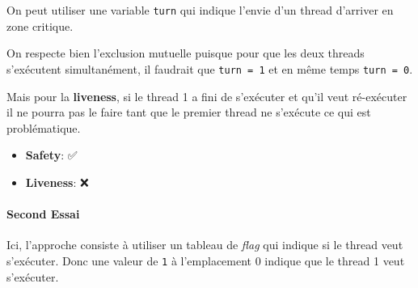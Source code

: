 On peut utiliser une variable \texttt{turn} qui indique l'envie d'un
thread d'arriver en zone critique.

\begin{Shaded}
\begin{Highlighting}[]
 \OperatorTok{(}\OperatorTok{!=}\OperatorTok{)} \OperatorTok{\{} 
\OperatorTok{\}} 
\OperatorTok{();}
\OperatorTok{=}\OperatorTok{;}

 \OperatorTok{(}\OperatorTok{!=}\OperatorTok{)} \OperatorTok{\{}
\OperatorTok{\}} 
\OperatorTok{();}
\OperatorTok{=}\OperatorTok{;}
\end{Highlighting}
\end{Shaded}

On respecte bien l'exclusion mutuelle puisque pour que les deux threads
s'exécutent simultanément, il faudrait que \texttt{turn\ =\ 1} et en
même temps \texttt{turn\ =\ 0}.

Mais pour la \textbf{liveness}, si le thread 1 a fini de s'exécuter et
qu'il veut ré-exécuter il ne pourra pas le faire tant que le premier
thread ne s'exécute ce qui est problématique.

\begin{itemize}
\tightlist
\item
  \textbf{Safety}: ✅
\item
  \textbf{Liveness}: ❌
\end{itemize}

\paragraph{Second Essai}\label{second-essai}

Ici, l'approche consiste à utiliser un tableau de \emph{flag} qui
indique si le thread veut s'exécuter. Donc une valeur de \texttt{1} à
l'emplacement 0 indique que le thread 1 veut s'exécuter.

